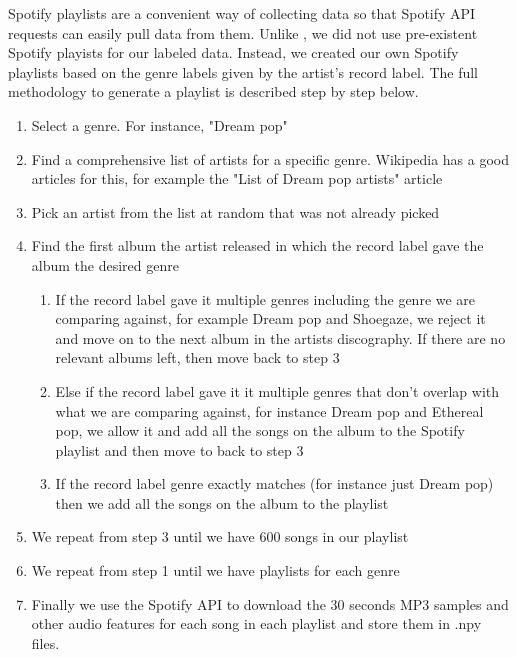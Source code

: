 \documentclass[letterpaper, 12 pt, conference]{ieeeconf}  %
\begin{document}
Spotify playlists are a convenient way of collecting data so that Spotify API requests can easily pull data from them. Unlike \cite{c5}, we did not use pre-existent Spotify playists for our labeled data. Instead, we created our own Spotify playlists based on the genre labels given by the artist’s record label. The full methodology to generate a playlist is described step by step below. 

\begin{enumerate}
    \item Select a genre. For instance, "Dream pop"
    \item Find a comprehensive list of artists for a specific genre. Wikipedia has a good articles for this, for example the "List of Dream pop artists" article
    \item Pick an artist from the list at random that was not already picked
    \item Find the first album the artist released in which the record label gave the album the desired genre
    \begin{enumerate}
        \item If the record label gave it multiple genres including the genre we are comparing against, for example Dream pop and Shoegaze, we reject it and move on to the next album in the artists discography. If there are no relevant albums left, then move back to step 3
        \item Else if the record label gave it it multiple genres that don't overlap with what we are comparing against, for instance Dream pop and Ethereal pop, we allow it and add all the songs on the album to the Spotify playlist and then move to back to step 3
        \item If the record label genre exactly matches (for instance just Dream pop) then we add all the songs on the album to the playlist
    \end{enumerate}

    \item We repeat from step 3 until we have 600 songs in our playlist
    \item We repeat from step 1 until we have playlists for each genre
    \item Finally we use the Spotify API to download the 30 seconds MP3 samples and other audio features for each song in each playlist and store them in .npy files.
\end{enumerate}
\end{document}
